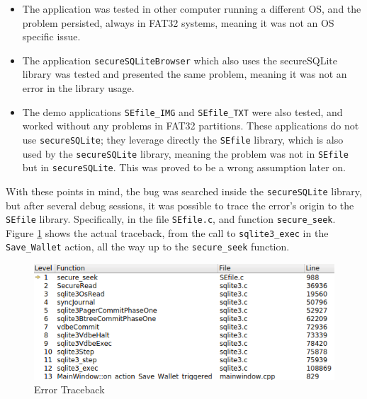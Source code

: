 \begin{itemize}
\setlength\itemsep{-3pt}

\item The application was tested in other computer running a different OS, and the problem persisted, always in FAT32 systems, meaning it was not an OS specific issue.
\item The application \texttt{secureSQLiteBrowser} which also uses the secureSQLite library was tested and presented the same problem, meaning it was not an error in the library usage.
\item The demo applications \texttt{SEfile\_IMG}  and \texttt{SEfile\_TXT} were also tested, and worked without any problems in FAT32 partitions. These applications do not use \texttt{secureSQLite}; they leverage directly the \texttt{SEfile} library, which is also used by the \texttt{secureSQLite} library, meaning the problem was not in \texttt{SEfile} but in \texttt{secureSQLite}. This was proved to be a wrong assumption later on.
\end{itemize}

With these points in mind, the bug was searched inside the \texttt{secureSQLite} library, but after several debug sessions, it was possible to trace the error's origin to the \texttt{SEfile} library. Specifically, in the file \texttt{SEfile.c}, and function \texttt{secure\_seek}. Figure \ref{fig:traceback} shows the actual traceback, from the call to \texttt{sqlite3\_exec} in the \texttt{Save\_Wallet} action, all the way up to the \texttt{secure\_seek} function.

\begin{figure}[htb]
  \centering
  \captionsetup{justification=centering}
  \centerline{\includegraphics[width=0.8\columnwidth]{chapters/figures/development/traceback.png}}
  \caption{Error Traceback}
  \label{fig:traceback}
\end{figure}

